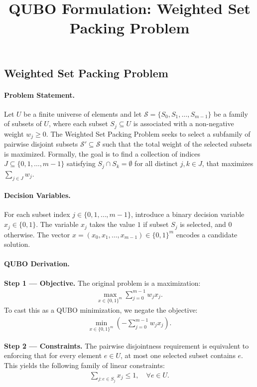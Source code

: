 \documentclass[12pt]{article}
\title{QUBO Formulation: Weighted Set Packing Problem}
\date{}
\begin{document}
\maketitle

\subsection*{Weighted Set Packing Problem}

\paragraph{Problem Statement.}
Let $U$ be a finite universe of elements and let $\mathcal{S} = \{S_0, S_1, \dots, S_{m-1}\}$ be a family of subsets of $U$, where each subset $S_j \subseteq U$ is associated with a non-negative weight $w_j \ge 0$. The Weighted Set Packing Problem seeks to select a subfamily of pairwise disjoint subsets $\mathcal{S}' \subseteq \mathcal{S}$ such that the total weight of the selected subsets is maximized. Formally, the goal is to find a collection of indices $J \subseteq \{0, 1, \dots, m-1\}$ satisfying $S_j \cap S_k = \emptyset$ for all distinct $j, k \in J$, that maximizes $\sum_{j \in J} w_j$.

\paragraph{Decision Variables.}
For each subset index $j \in \{0, 1, \dots, m-1\}$, introduce a binary decision variable $x_j \in \{0, 1\}$. The variable $x_j$ takes the value $1$ if subset $S_j$ is selected, and $0$ otherwise. The vector $x = (x_0, x_1, \dots, x_{m-1}) \in \{0, 1\}^m$ encodes a candidate solution.

\paragraph{QUBO Derivation.}
\textbf{Step 1 --- Objective.} The original problem is a maximization:
\begin{align}
    \max_{x \in \{0,1\}^m} \sum_{j=0}^{m-1} w_j x_j.
\end{align}
To cast this as a QUBO minimization, we negate the objective:
\begin{align}
    \min_{x \in \{0,1\}^m} \left( -\sum_{j=0}^{m-1} w_j x_j \right).
\end{align}

\textbf{Step 2 --- Constraints.} The pairwise disjointness requirement is equivalent to enforcing that for every element $e \in U$, at most one selected subset contains $e$. This yields the following family of linear constraints:
\begin{align}
    \sum_{j : e \in S_j} x_j \le 1, \quad \forall e \in U.
\end{align}
\end{document}
